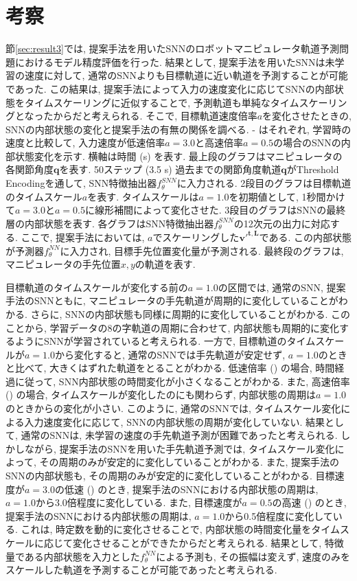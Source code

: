 \section{考察}

節\ref{sec:result3}では, 提案手法を用いたSNNのロボットマニピュレータ軌道予測問題におけるモデル精度評価を行った.
結果として, 提案手法を用いたSNNは未学習の速度に対して, 通常のSNNよりも目標軌道に近い軌道を予測することが可能であった.
この結果は, 提案手法によって入力の速度変化に応じてSNNの内部状態をタイムスケーリングに近似することで, 予測軌道も単純なタイムスケーリングとなったからだと考えられる.
そこで, 目標軌道速度倍率$a$を変化させたときの, SNNの内部状態の変化と提案手法の有無の関係を調べる.
 - はそれぞれ, 学習時の速度と比較して, 入力速度が低速倍率$a=3.0$と高速倍率$a=0.5$の場合のSNNの内部状態変化を示す.
横軸は時間 (s) を表す.
最上段のグラフはマニピュレータの各関節角度$\bm{q}$を表す.
50ステップ (3.5 s) 過去までの関節角度軌道$\bm{q}$がThreshold Encodingを通して, SNN特徴抽出器$f^{SNN}_\theta$に入力される.
2段目のグラフは目標軌道のタイムスケール$a$を表す.
タイムスケールは$a=1.0$を初期値として, 1秒間かけて$a=3.0$と$a=0.5$に線形補間によって変化させた.
3段目のグラフはSNNの最終層の内部状態を表す.
各グラフはSNN特徴抽出器$f^{SNN}_\theta$の12次元の出力に対応する.
ここで, 提案手法においては, $a$でスケーリングした$\bm{{v'}^{t,L}}$である.
この内部状態が予測器$f^{NN}_\theta$に入力され, 目標手先位置変化量が予測される.
最終段のグラフは, マニピュレータの手先位置$x,y$の軌道を表す.

目標軌道のタイムスケールが変化する前の$a=1.0$の区間では, 通常のSNN, 提案手法のSNNともに, マニピュレータの手先軌道が周期的に変化していることがわかる.
さらに, SNNの内部状態も同様に周期的に変化していることがわかる.
このことから, 学習データの8の字軌道の周期に合わせて, 内部状態も周期的に変化するようにSNNが学習されていると考えられる.
一方で, 目標軌道のタイムスケールが$a=1.0$から変化すると, 通常のSNNでは手先軌道が安定せず, $a=1.0$のときと比べて, 大きくはずれた軌道をとることがわかる.
低速倍率 () の場合, 時間経過に従って, SNN内部状態の時間変化が小さくなることがわかる.
また, 高速倍率 () の場合, タイムスケールが変化したのにも関わらず, 内部状態の周期は$a=1.0$のときからの変化が小さい.
このように, 通常のSNNでは, タイムスケール変化による入力速度変化に応じて, SNNの内部状態の周期が変化していない.
結果として, 通常のSNNは, 未学習の速度の手先軌道予測が困難であったと考えられる.
しかしながら, 提案手法のSNNを用いた手先軌道予測では, タイムスケール変化によって, その周期のみが安定的に変化していることがわかる.
また, 提案手法のSNNの内部状態も, その周期のみが安定的に変化していることがわかる.
目標速度が$a=3.0$の低速 () のとき, 提案手法のSNNにおける内部状態の周期は, $a=1.0$から3.0倍程度に変化している.
また, 目標速度が$a=0.5$の高速 () のとき, 提案手法のSNNにおける内部状態の周期は, $a=1.0$から0.5倍程度に変化している.
これは, 時定数を動的に変化させることで, 内部状態の時間変化量をタイムスケールに応じて変化させることができたからだと考えられる.
結果として, 特徴量である内部状態を入力とした$f^{NN}_\theta$による予測も, その振幅は変えず, 速度のみをスケールした軌道を予測することが可能であったと考えられる.

